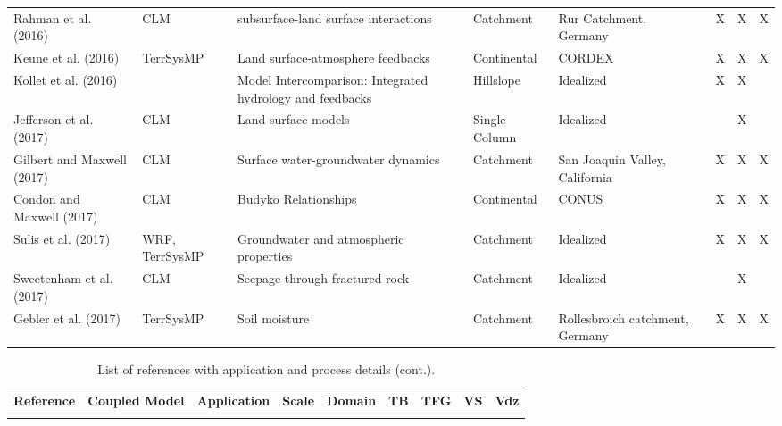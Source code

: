 {\begin{table}
\begin{tabular}{ l  p{1.5cm} p{2cm} p{1.5cm} p{1.5cm} | c | c | c | c }
\cite{Rahman2016} Rahman et al. (2016) & CLM & subsurface-land surface interactions & Catchment & Rur Catchment, Germany & &X &X &X \\
\cite{Keune2016} Keune et al. (2016) & TerrSysMP & Land surface-atmosphere feedbacks & Continental & CORDEX & &X &X &X \\
\cite{Kollet2016} Kollet et al. (2016) &  & Model Intercomparison: Integrated hydrology and feedbacks & Hillslope & Idealized & &X &X & \\
\cite{Jefferson2017} Jefferson et al. (2017) & CLM & Land surface models & Single Column & Idealized & & &X & \\
\cite{Gilbert2017a} Gilbert and Maxwell (2017) & CLM & Surface water-groundwater dynamics & Catchment & San Joaquin Valley, California & &X &X &X \\
\cite{Condon2017} Condon and Maxwell (2017) & CLM & Budyko Relationships & Continental & CONUS & &X &X &X \\					
\cite{Sulis2017} Sulis et al. (2017) & WRF, TerrSysMP & Groundwater and atmospheric properties & Catchment & Idealized & &X &X &X \\		
\cite{Sweetenham2017} Sweetenham et al. (2017) & CLM & Seepage through fractured rock & Catchment & Idealized & & &X & \\		
\cite{Gebler2017} Gebler et al. (2017) & TerrSysMP & Soil moisture & Catchment & Rollesbroich catchment, Germany & &X &X &X \\				

\end{tabular}
\label{pfref12}
\end{table}


\begin{table} \center
\renewcommand{\arraystretch}{2.5}
\center
\caption{List of \parflow{} references with application and process details (cont.).}
\begin{tabular}{ l  p{1.5cm} p{2cm} p{1.5cm} p{1.5cm} | c | c | c | c }
\bf{Reference} & \bf{Coupled Model} & \bf{Application} & \bf{Scale} & \bf{Domain} & \bf{TB} & \bf{TFG} & \bf{VS} & \bf{Vdz} \\   
\hline{}


\end{tabular}
\end{table}}
